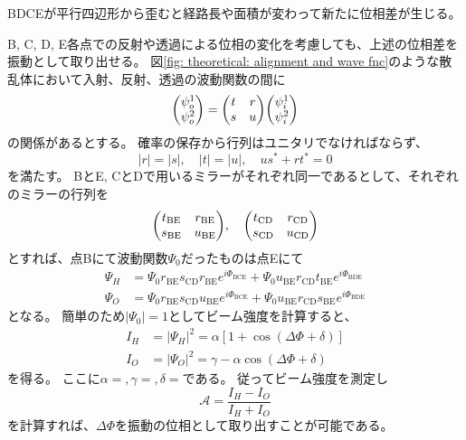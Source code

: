 \documentclass[dvipdfmx]{jsarticle}
\begin{document}
BDCEが平行四辺形から歪むと経路長や面積が変わって新たに位相差が生じる。





B, C, D, E各点での反射や透過による位相の変化を考慮しても、上述の位相差を振動として取り出せる。
図\ref{fig: theoretical: alignment and wave fnc}のような散乱体において入射、反射、透過の波動関数の間に
\begin{equation*}
    \mqty(\psi_o^1\\\psi_o^2)
    =
    \mqty(t & r \\ s & u)
    \mqty(\psi_i^1\\\psi_i^2)
\end{equation*}
の関係があるとする。
確率の保存から行列はユニタリでなければならず、
\begin{equation*}
    |r|=|s|,
    \quad
    |t|=|u|,
    \quad
    us^\ast+rt^\ast=0
\end{equation*}
を満たす。
BとE, CとDで用いるミラーがそれぞれ同一であるとして、それぞれのミラーの行列を
\begin{equation*}
    \mqty(t_\mathrm{BE} & r_\mathrm{BE} \\ s_\mathrm{BE} & u_\mathrm{BE}),
    \quad
    \mqty(t_\mathrm{CD} & r_\mathrm{CD} \\ s_\mathrm{CD} & u_\mathrm{CD})
\end{equation*}
とすれば、点Bにて波動関数$\Psi_0$だったものは点Eにて
\begin{equation*}
    \begin{split}
        \Psi_H
        &=
        \Psi_0r_\mathrm{BE}s_\mathrm{CD}r_\mathrm{BE}
        e^{i\Phi_\mathrm{BCE}}
        +
        \Psi_0u_\mathrm{BE}r_\mathrm{CD}t_\mathrm{BE}
        e^{i\Phi_\mathrm{BDE}}
        \\
        \Psi_O
        &=
        \Psi_0r_\mathrm{BE}s_\mathrm{CD}u_\mathrm{BE}
        e^{i\Phi_\mathrm{BCE}}
        +
        \Psi_0u_\mathrm{BE}r_\mathrm{CD}s_\mathrm{BE}
        e^{i\Phi_\mathrm{BDE}}
    \end{split}
\end{equation*}
となる。
簡単のため$|\Psi_0|=1$としてビーム強度を計算すると、
\begin{equation*}
    \begin{split}
        I_H
        &=
        |\Psi_H|^2
        =
        \alpha[1+\cos(\Delta\Phi+\delta)]
        \\
        I_O
        &=
        |\Psi_O|^2
        =
        \gamma
        -
        \alpha\cos(\Delta\Phi+\delta)
    \end{split}
\end{equation*}
を得る。
ここに$\alpha=, \gamma=, \delta=$である。
従ってビーム強度を測定し
\begin{equation*}
    \mathscr{A}
    =
    \frac{I_H-I_O}{I_H+I_O}
\end{equation*}
を計算すれば、$\Delta\Phi$を振動の位相として取り出すことが可能である。
\end{document}
